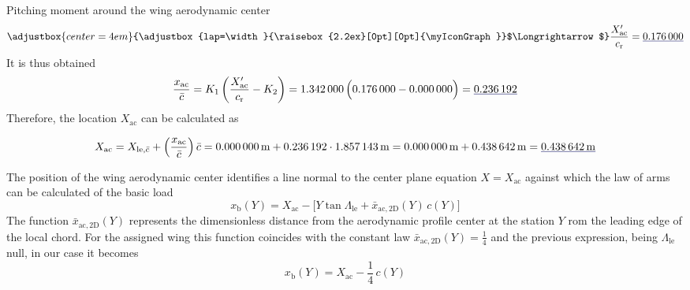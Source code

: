 \documentclass[[12pt,twoside]{book}
\begin{document}
\begin{myExampleX}{Pitching moment around the wing aerodynamic center}{}
\[\adjustbox{center=4em}{%
  \adjustbox{lap=\width}{\raisebox{2.2ex}[0pt][0pt]{\myIconGraph}}$\Longrightarrow$%
}
%
\frac{X'_{\mathrm{ac}}}{c_\mathrm{r}}
  = \mathunderline{mydarkblue}{ \SI[round-precision=3]{\myXACOverChordRootDatcomWing}{} }
\]
%
It is thus obtained
\[
\frac{x_{\mathrm{ac}}}{\bar{c}} 
  = K_1 \left( \frac{X'_{\mathrm{ac}}}{c_\mathrm{r}} - K_2  \right)
  = \SI[round-precision=3]{\myKOneACDatcomWing}{} \,
    \Big(  
      \SI[round-precision=3]{\myXACOverChordRootDatcomWing}{} 
        - \SI[round-precision=0]{\myKTwoACDatcomWing}{}  
    \Big)
  = \mathunderline{mydarkblue}{ \SI[round-precision=3]{\myXsiACWing}{} } 
\]
%
Therefore, the location $X_\mathrm{ac}$ can be calculated as

\[
X_\mathrm{ac} 
  =
    X_{\mathrm{le},\bar{c}} + \left( \frac{x_{\mathrm{ac}}}{\bar{c}} \right) \bar{c}
=
    \SI[round-precision=0]{\myXMACLEToApexWingMT}{\metre}
      + \SI[round-precision=3]{\myXsiACWing}{}
        \cdot \SI[round-precision=2]{\myMACWingMT}{\metre}
      = \SI[round-precision=0]{\myXMACLEToApexWingMT}{\metre}
        + \SI[round-precision=2]{\myACWingToMACLEWingMT}{\metre} 
    = \mathunderline{mydarkblue}{ 
      \SI[round-precision=2]{\myACWingToApexWingMT}{\metre} 
    }%
\]

The position of the wing aerodynamic center identifies a line normal to the center plane
equation $X=X_\mathrm{ac}$ against which the law of arms can be calculated
of the basic load
\[
x_\mathrm{b}(Y) 
  = X_\mathrm{ac} 
    - \Big[ Y \tan \Lambda_\mathrm{le} + \bar{x}_{\mathrm{ac,2D}} (Y) \, c(Y) \Big]
\]
The function $\bar{x}_{\mathrm{ac,2D}}(Y)$ represents the dimensionless distance from the aerodynamic profile center
at the station $Y$ rom the leading edge of the local chord. 
For the assigned wing this function coincides with the constant law
$\bar{x}_{\mathrm{ac,2D}}(Y) = \frac{1}{4}$ and the previous expression,
being $\Lambda_\mathrm{le}$ null, in our case it becomes
\[
x_\mathrm{b}(Y) = X_\mathrm{ac} - \frac{1}{4} \, c(Y)
\]


\end{myExampleX}
\end{document}

